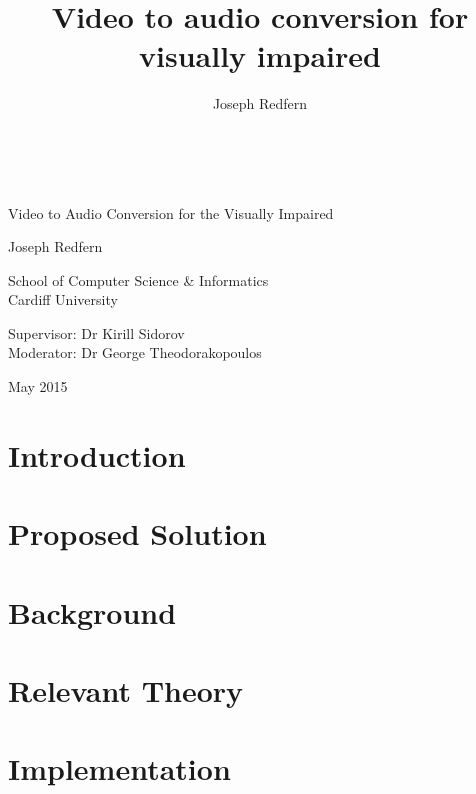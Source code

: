 \documentclass[11pt,a4paper]{memoir}
\author{Joseph Redfern}
\title{Video to audio conversion for visually impaired}
\date{}
\begin{document}
\frontmatter
\thispagestyle{empty}

{%
\sffamily
\centering
\Large

~\vspace{\fill}

{\huge 
    Video to Audio Conversion for the Visually Impaired
}

\vspace{2.5cm}

{\LARGE
    Joseph Redfern
}

\vspace{3.5cm}

School of Computer Science \& Informatics\\
Cardiff University

\vspace{3.5cm}

Supervisor: Dr Kirill Sidorov \\
Moderator: Dr George Theodorakopoulos

\vspace{\fill}

May 2015

}

\newpage



\newpage

\tableofcontents*



\mainmatter

\chapter{Introduction}


\chapter{Proposed Solution}


\chapter{Background}


\chapter{Relevant Theory}


\chapter{Implementation}


\newpage



\newpage
\printbibliography
\end{document}
